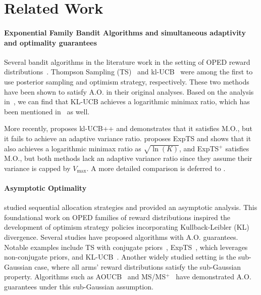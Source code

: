 \section{Related Work}
\label{sec:related}

\paragraph{Exponential Family Bandit Algorithms and simultaneous adaptivity and optimality guarantees} Several bandit algorithms in the literature work in the setting of OPED reward distributions~\citep{korda2013thompson, cappe2013kullback, menard17minimax}. 
Thompson Sampling 
(TS)~\citep{thompson1933likelihood} and kl-UCB~\citep{cappe2013kullback} were among the first to use posterior sampling and optimism strategy, respectively. 
These two methods have been shown to satisfy A.O. in their original analyses. 
Based on the analysis in~\citet{lattimore20bandit}, we can find that KL-UCB achieves a logarithmic minimax ratio, which has been mentioned in~\citet{qin2023kullback} as well.


More recently, \citet{menard17minimax} proposes kl-UCB++ and demonstrates that it satisfies M.O., but it fails to achieve an adaptive variance ratio. 
\citet{jin2022finite} proposes ExpTS and shows that it also achieves a logarithmic minimax ratio as $\sqrt{\ln(K)}$, and ExpTS$^+$ satisfies M.O., but both methods lack an adaptive variance ratio since they assume their variance is capped by $V_{\max}$. 
A more detailed comparison is deferred to .


\paragraph{Asymptotic Optimality} \citet{lai85asymptotically} studied sequential allocation strategies and provided an asymptotic analysis. This foundational work on OPED families of reward distributions inspired the development of optimism strategy policies incorporating Kullback-Leibler (KL) divergence.
Several studies have proposed algorithms with A.O. guarantees. Notable examples include TS with conjugate priors~\citep{korda2013thompson}, ExpTS~\citep{jin2022finite}, which leverages non-conjugate priors, and KL-UCB~\citep{cappe2013kullback}. Another widely studied setting is the sub-Gaussian case, where all arms' reward distributions satisfy the sub-Gaussian property. Algorithms such as AOUCB~\citep{lattimore20bandit} and MS/MS$^+$~\citep{bian2022maillard} have demonstrated A.O. guarantees under this sub-Gaussian assumption.



